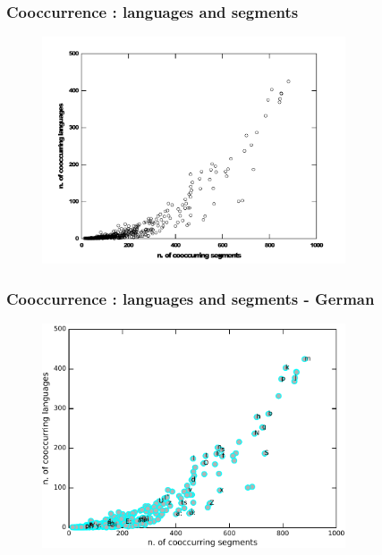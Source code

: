 \documentclass[notes]{beamer}
\begin{document}
\frame
{
  \frametitle{Cooccurrence : languages and segments}
  \vspace{-0.3cm}
  \begin{figure}[h!]
  \centering
  \includegraphics[width=0.8\textwidth]{images/coocc_of_speech_sounds.pdf}
  \label{fig:coocc_of_speech_sounds}
  \end{figure} 
}


\frame
{
  \frametitle{Cooccurrence : languages and segments - German}
  \vspace{-0.3cm}
  \begin{figure}[h!]
  \centering
  \includegraphics[width=0.8\textwidth]{images/coocc_of_speech_sounds_german.pdf}
  \label{fig:coocc_of_speech_sounds_german}
  \end{figure}
}
\end{document}

